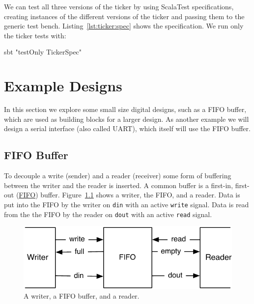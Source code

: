 \documentclass[%
    10pt,
    headinclude, footexclude,
    openright, %
    notitlepage,
    cleardoubleempty,
    headsepline,
    pointlessnumbers,
    bibtotoc, idxtotoc,
    ]{scrbook}
\newcommand{\code}[1]{{\small{\texttt{#1}}}}
\newcommand{\scale}{0.7}
\begin{document}
We can test all three versions of the ticker by using ScalaTest specifications,
creating instances of the different versions of the ticker and passing them
to the generic test bench. Listing~\ref{lst:ticker:spec} shows the specification.
We run only the ticker tests with:
\begin{chisel}
sbt "testOnly TickerSpec"
\end{chisel}





\chapter{Example Designs}

In this section we explore some small size digital designs, such as
a FIFO buffer, which are used as building blocks for a larger design.
As another example we will design a serial interface (also called UART),
which itself will use the FIFO buffer.

\section{FIFO Buffer}

To decouple a write (sender) and a reader (receiver) some form
of buffering between the writer and the reader is inserted.
A common buffer is a first-in, first-out
(\href{https://en.wikipedia.org/wiki/FIFO_%28computing_and_electronics%29}{FIFO})
buffer. Figure~\ref{fig:fifo} shows a writer, the FIFO, and a reader.
Data is put into the FIFO by the writer on \code{din} with an active
\code{write} signal. Data is read from the the FIFO by the reader on
\code{dout} with an active \code{read} signal.

\begin{figure}
  \centering
  \includegraphics[scale=\scale]{figures/fifo}
  \caption{A writer, a FIFO buffer, and a reader.}
  \label{fig:fifo}
\end{figure}
\end{document}
